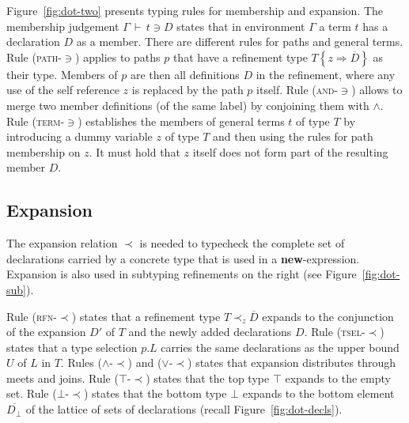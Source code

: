 \documentclass[9pt]{sigplanconf}
\newcommand{\figref}[1]
        {Figure~\ref{fig:#1}}
\newcommand{\ts}{\,\vdash\,}
\newcommand{\expand}{\prec}
\newcommand{\tand}{\wedge}
\newcommand{\tor}{\vee}
\newcommand{\refine}[2]{\left\{#1 \Rightarrow #2 \right\}}
\newcommand{\seq}[1]{\overline{#1}}
\newcommand{\Bot}{\bot}%
\begin{document}
\figref{dot-two} presents typing rules for membership and
expansion.  The membership judgement $\Gamma \ts t \ni D$ states that
in environment $\Gamma$ a term $t$ has a declaration $D$ as a member.
There are different rules for paths and general terms.  Rule
(\textsc{path-$\ni$}) applies to paths $p$ that have a refinement type
$T \refine z {\seq D}$ as their type. Members of $p$ are then all
definitions $D$ in the refinement, where any use of the self reference
$z$ is replaced by the path $p$ itself.  Rule (\textsc{and-$\ni$})
allows to merge two member definitions (of the same label) by
conjoining them with $\tand$. Rule (\textsc{term-$\ni$}) establishes
the members of general terms $t$ of type $T$ by introducing a dummy
variable $z$ of type $T$ and then using the rules for path membership
on $z$. It must hold that $z$ itself does not form part of the
resulting member $D$.

\subsection*{Expansion}
      
The expansion relation $\expand$ is needed to typecheck the complete
set of declarations carried by a concrete type that is used in a
\textbf{new}-expression. Expansion is also used in subtyping
refinements on the right (see \figref{dot-sub}).

Rule (\textsc{rfn-$\expand$}) states that a refinement type $T
\expand_z {\seq D}$ expands to the conjunction of the expansion $D'$
of $T$ and the newly added declarations $D$. Rule
(\textsc{tsel-$\expand$}) states that a type selection $p.L$ carries
the same declarations as the upper bound $U$ of $L$ in $T$.  Rules
($\tand$-$\expand$) and ($\tor$-$\expand$) states that expansion
distributes through meets and joins.  Rule (\textsc{$\top$-$\expand$})
states that the top type $\top$ expands to the empty set. Rule
(\textsc{$\bot$-$\expand$}) states that the bottom type $\bot$ expands
to the bottom element $\seq{D_\Bot}$ of the lattice of sets of
declarations (recall \figref{dot-decls}).
\end{document}
